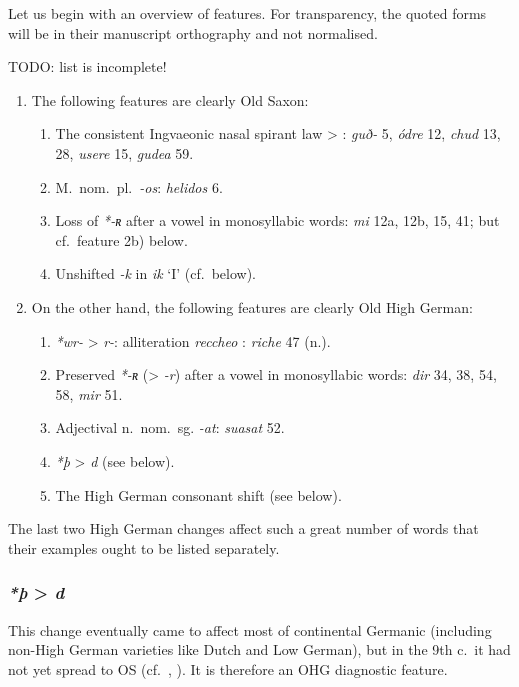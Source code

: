 Let us begin with an overview of features.  For transparency, the quoted forms will be in their manuscript orthography and not normalised.

TODO: list is incomplete!

\begin{enumerate}
  \item The following features are clearly Old Saxon: \begin{enumerate}
    \item The consistent Ingvaeonic nasal spirant law  > : \emph{guð-} 5, \emph{ódre} 12, \emph{chud} 13, 28, \emph{usere} 15, \emph{gudea} 59.
    \item M.~nom.~pl.~\emph{-os}: \emph{helidos} 6.
    \item Loss of \emph{*-ʀ} after a vowel in monosyllabic words: \emph{mi} 12a, 12b, 15, 41; but cf.~feature 2b) below.
    \item Unshifted \emph{-k} in \emph{ik} ‘I’ (cf.~below).
  \end{enumerate}

  \item On the other hand, the following features are clearly Old High German: \begin{enumerate}
    \item \emph{*wr-} > \emph{r-}: alliteration \emph{reccheo} : \emph{riche} 47 (n.).
    \item Preserved \emph{*-ʀ} (> \emph{-r}) after a vowel in monosyllabic words: \emph{dir} 34, 38, 54, 58, \emph{mir} 51.
    \item Adjectival n.~nom.~sg. \emph{-at}: \emph{suasat} 52.
    \item \emph{*þ} > \emph{d} (see below).
    \item The High German consonant shift (see below).
  \end{enumerate}
\end{enumerate}

The last two High German changes affect such a great number of words that their examples ought to be listed separately.

\subsubsection{\emph{*þ} > \emph{d}}

This change eventually came to affect most of continental Germanic (including non-High German varieties like Dutch and Low German), but in the 9th c.~it had not yet spread to OS (cf.~, ).  It is therefore an OHG diagnostic feature.

